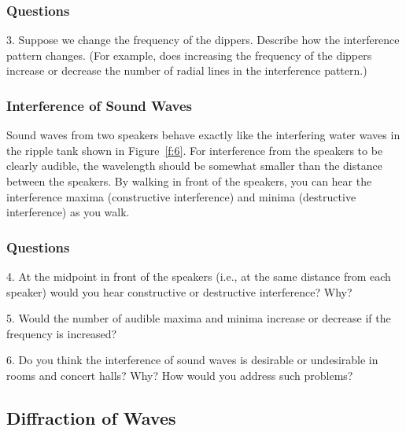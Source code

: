 \documentclass[11pt]{NSF}
\begin{document}
\subsubsection*{Questions}

3.	 Suppose we change the frequency of the dippers.
Describe how the interference pattern changes.
(For example, does increasing the frequency of the 
dippers increase or decrease the number of radial 
lines in the interference pattern.)


\subsubsection{Interference of Sound Waves}

Sound waves from two speakers behave exactly like the 
interfering water waves in the ripple tank shown
in Figure~\ref{f:6}.
For interference from the speakers to be clearly audible, 
the wavelength should be somewhat smaller than the distance between the speakers.
By walking in front of the speakers, you can hear the
interference maxima (constructive interference) and 
minima (destructive interference) as you walk.

\subsubsection*{Questions}

4.	 At the midpoint in front of the speakers (i.e., at the 
same distance from each speaker) would you hear 
constructive or destructive interference? Why?

5.	 Would the number of audible maxima and minima 
increase or decrease if the frequency is increased?

6.	 Do you think the interference of sound waves is desirable 
or undesirable in rooms and concert halls?  
Why? How would you address such problems?


\subsection{Diffraction of Waves}
\end{document}
